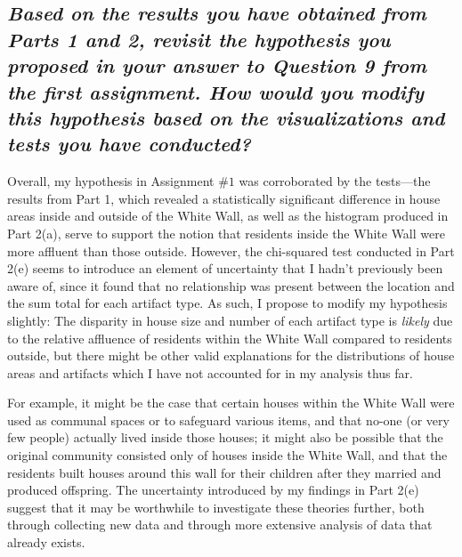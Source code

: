 \documentclass[answers]{exam}
\begin{document}
\begin{parts}
    \part{\textit{Based on the results you have obtained from Parts 1 and 2, revisit the hypothesis you proposed in your answer to Question 9 from the first assignment. How would you modify this hypothesis based on the visualizations and tests you have conducted?}}\color{nr}

    \quad\quad Overall, my hypothesis in Assignment $\#1$ was corroborated by the tests---the results from Part 1, which revealed a statistically significant difference in house areas inside and outside of the White Wall, as well as the histogram produced in Part 2(a), serve to support the notion that residents inside the White Wall were more affluent than those outside. However, the chi-squared test conducted in Part 2(e) seems to introduce an element of uncertainty that I hadn't previously been aware of, since it found that no relationship was present between the location and the sum total for each artifact type. As such, I propose to modify my hypothesis slightly: The disparity in house size and number of each artifact type is \textit{likely} due to the relative affluence of residents within the White Wall compared to residents outside, but there might be other valid explanations for the distributions of house areas and artifacts which I have not accounted for in my analysis thus far.

    \quad\quad For example, it might be the case that certain houses within the White Wall were used as communal spaces or to safeguard various items, and that no-one (or very few people) actually lived inside those houses; it might also be possible that the original community consisted only of houses inside the White Wall, and that the residents built houses around this wall for their children after they married and produced offspring. The uncertainty introduced by my findings in Part 2(e) suggest that it may be worthwhile to investigate these theories further, both through collecting new data and through more extensive analysis of data that already exists.
\end{parts}
\end{document}
